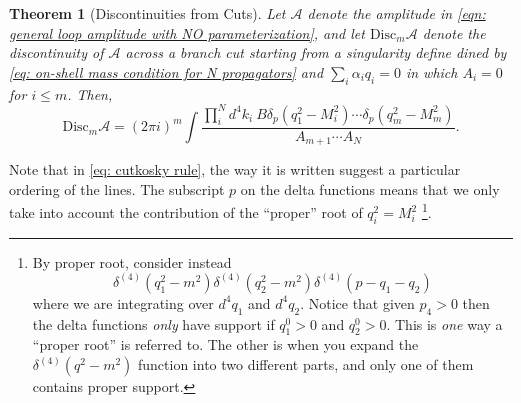 \documentclass[a4paper,11pt]{article}
\newtheorem{theorem}{Theorem}
\begin{document}
\begin{theorem}[Discontinuities from Cuts]
    Let $\mathcal{A}$ denote the amplitude in \eqref{eqn: general loop amplitude with NO parameterization}, and let $\text{Disc}_m\mathcal{A}$ denote the discontinuity of $\mathcal{A}$ across a branch cut starting from a singularity define dined by \eqref{eq: on-shell mass condition for N propagators} and $\sum_i\alpha_iq_i = 0$ in which $A_i = 0$ for $i\leq m$. Then,
    \begin{equation}
        \text{Disc}_m\mathcal{A} = (2\pi i)^m\int\frac{\prod_i^Nd^4k_i\: B\delta_p(q_1^2-M_i^2)\cdots\delta_p(q_m^2-M_m^2)}{A_{m+1}\cdots A_N}\label{eq: cutkosky rule}.
    \end{equation}
\end{theorem}
Note that in \eqref{eq: cutkosky rule}, the way it is written suggest a particular ordering of the lines. The subscript $p$ on the delta functions means that we only take into account the contribution of the ``proper'' root of $q_i^2 =M_i^2$ \footnote{By proper root, consider instead 
\begin{equation}
    \delta^{(4)}(q_1^2 - m^2)\delta^{(4)}(q_2^2 - m^2)\delta^{(4)}(p-q_1-q_2)
\end{equation}
where we are integrating over $d^4q_1$ and $d^4q_2$. Notice that given $p_4>0$ then the delta functions \textit{only} have support if $q_1^0>0$ and $q_2^0>0$. This is \textit{one} way a ``proper root'' is referred to. The other is when you expand the $\delta^{(4)}(q^2-m^2)$ function into two different parts, and only one of them contains proper support.}.
\end{document}

